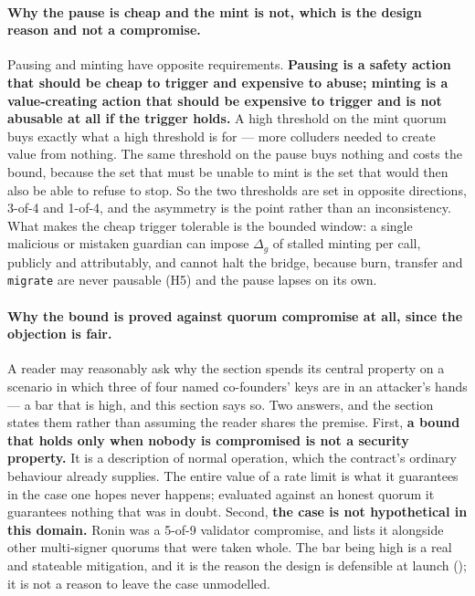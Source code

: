 \paragraph{Why the pause is cheap and the mint is not, which is the design reason and not a
compromise.} Pausing and minting have opposite requirements. \textbf{Pausing is a safety action that
should be cheap to trigger and expensive to abuse; minting is a value-creating action that should be
expensive to trigger and is not abusable at all if the trigger holds.} A high threshold on the mint
quorum buys exactly what a high threshold is for --- more colluders needed to create value from
nothing. The same threshold on the pause buys nothing and costs the bound, because the set that must
be unable to mint is the set that would then also be able to refuse to stop. So the two thresholds
are set in opposite directions, 3-of-4 and 1-of-4, and the asymmetry is the point rather than an
inconsistency. What makes the cheap trigger tolerable is the bounded window: a single malicious or
mistaken guardian can impose $\Delta_g$ of stalled minting per call, publicly and attributably, and
cannot halt the bridge, because burn, transfer and \texttt{migrate} are never pausable (H5) and the
pause lapses on its own.

\paragraph{Why the bound is proved against quorum compromise at all, since the objection is fair.}
A reader may reasonably ask why the section spends its central property on a scenario in which three
of four named co-founders' keys are in an attacker's hands --- a bar that is high, and this section
says so. Two answers, and the section states them rather than assuming the reader shares the
premise. First, \textbf{a bound that holds only when nobody is compromised is not a security
property.} It is a description of normal operation, which the contract's ordinary behaviour already
supplies. The entire value of a rate limit is what it guarantees in the case one hopes never happens;
evaluated against an honest quorum it guarantees nothing that was in doubt. Second, \textbf{the case
is not hypothetical in this domain.} Ronin was a 5-of-9 validator compromise, and
 lists it alongside other multi-signer quorums that were taken whole. The
bar being high is a real and stateable mitigation, and it is the reason the design is defensible at
launch (); it is not a reason to leave the case unmodelled. \planned

